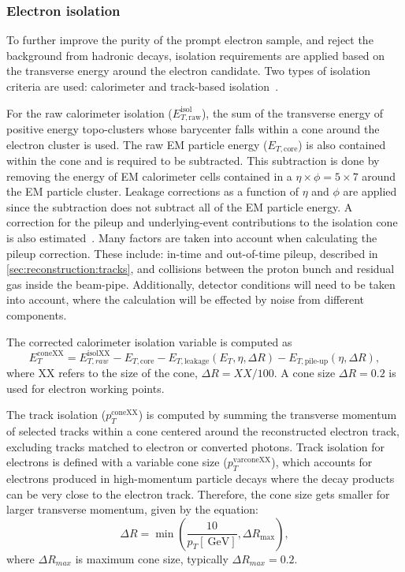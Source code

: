 \subsubsection{Electron isolation}
To further improve the purity of the prompt electron sample, and reject the background from hadronic decays, isolation requirements are applied based on the transverse energy around the electron candidate. Two types of isolation criteria are used: calorimeter and track-based isolation~\cite{Aad:2019tso}.

For the raw calorimeter isolation ($E_{T,\mathrm{raw}}^{\mathrm{isol}}$), the sum of the transverse energy of positive energy topo-clusters whose barycenter falls within a cone around the electron cluster is used. The raw EM particle energy ($E_{T,\mathrm{core}}$) is also contained within the cone and is required to be subtracted. This subtraction is done by removing the energy of EM calorimeter cells contained in a $\eta \times \phi = 5 \times 7$ around the EM particle cluster. Leakage corrections as a function of $\eta$ and $\phi$ are applied since the subtraction does not subtract all of the EM particle energy. A correction for the pileup and underlying-event contributions to the isolation cone is also estimated~\cite{Cacciari:2007fd}. Many factors are taken into account when calculating the pileup correction. These include: in-time and out-of-time pileup, described in \cref{sec:reconstruction:tracks}, and collisions between the proton bunch and residual gas inside the beam-pipe. Additionally, detector conditions will need to be taken into account, where the calculation will be effected by noise from different components. 

The corrected calorimeter isolation variable is computed as
\begin{equation}
    E_{T}^{\mathrm{coneXX}} = E_{T,raw}^{\mathrm{isolXX}} - E_{T,\mathrm{core}} - E_{T,\mathrm{leakage}}(E_T,\eta,\Delta R) - E_{{T,\textrm{pile-up}}}(\eta,\Delta R),
\end{equation}
where XX refers to the size of the cone, $\Delta R = XX/100$. A cone size $\Delta R = 0.2$ is used for electron working points.  

The track isolation ($p_{T}^{\mathrm{coneXX}}$) is computed by summing the transverse momentum of selected tracks within a cone centered around the reconstructed electron track, excluding tracks matched to electron or converted photons. Track isolation for electrons is defined with a variable cone size ($p_{T}^{\mathrm{varconeXX}}$), which accounts for electrons produced in high-momentum particle decays where the decay products can be very close to the electron track. Therefore, the cone size gets smaller for larger transverse momentum, given by the equation: 
\begin{equation}
    \Delta R = \min \left( \frac{10}{p_T[\SI{}{\giga\electronvolt}]}, \Delta R_{\mathrm{max}}\right),
\end{equation}
where $\Delta R_{max}$ is maximum cone size, typically $\Delta R_{max} = 0.2$. 


